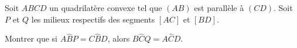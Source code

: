 \documentclass[varwidth]{standalone}
\begin{document}
    Soit $ABCD$ un quadrilat\`ere convexe tel que $(AB)$ est parall\`ele \`a $(CD)$. Soit $P$ et $Q$ les milieux respectifs des segments $[AC]$ et $[BD]$.

    Montrer que si $A\hat{B}P = C\hat{B}D$, alors $B\hat{C}Q = A\hat{C}D$.
\end{document}
